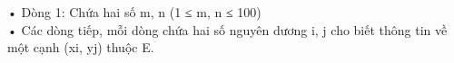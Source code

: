 • Dòng 1: Chứa hai số m, n (1 ≤ m, n ≤ 100)   
\\   • Các dòng tiếp, mỗi dòng chứa hai số nguyên dương i, j cho biết thông tin về một cạnh (xi, yj) thuộc E.  

\